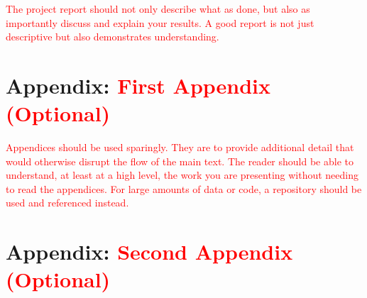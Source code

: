 \documentclass[aps,pra,a4paper,nofootinbib,onecolumn,tightenlines,longbibliography,12pt,amsfonts,amssymb,amsmath,floatfix]{revtex4-2} %
\begin{document}
\textcolor{red}{The project report should not only describe what as done, but also as importantly discuss and explain your results. A good report is not just descriptive but also demonstrates understanding.}

\Blindtext %

\blindtext[5]

\newpage




\appendix 

\newpage
\section{Appendix: \textcolor{red}{First Appendix (Optional)}}

\textcolor{red}{Appendices should be used sparingly. They are to provide additional detail that would otherwise disrupt the flow of the main text. The reader should be able to understand, at least at a high level, the work you are presenting without needing to read the appendices. For large amounts of data or code, a repository should be used and referenced instead.}

\newpage
\section{Appendix: \textcolor{red}{Second Appendix (Optional)}}



\end{document}
